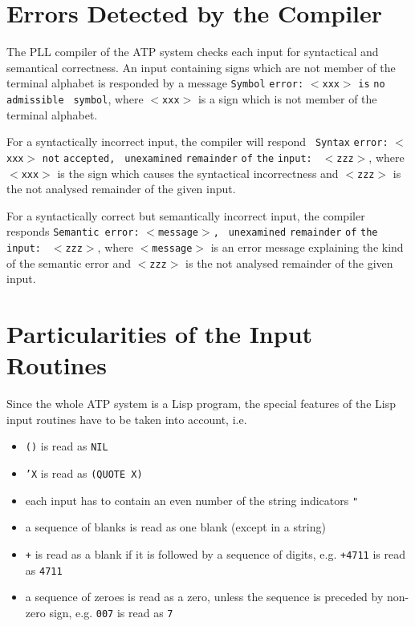 \section{Errors Detected by the Compiler}
\label{ErrorsdetectedbytheCompiler}

The PLL compiler of the ATP system checks each input for syntactical
and semantical correctness. An input containing signs which are not
member of the terminal alphabet is responded by a message {\tt Symbol}
{\tt error:} {\tt $<$xxx$>$} {\tt is} {\tt no} {\tt admissible} {\tt
symbol}, where {\tt $<$xxx$>$} is a sign which is not member of the terminal
alphabet.

For a syntactically incorrect input, the compiler will respond {\tt
Syntax} {\tt error:} {\tt $<$xxx$>$} {\tt not} {\tt accepted,} {\tt
unexamined} {\tt remainder} {\tt of} {\tt the} {\tt input:} {\tt
$<$zzz$>$}, where $<${\tt xxx}$>$ is the sign which causes the
syntactical incorrectness and {\tt $<$zzz$>$} is the not analysed
remainder of the given input.

For a syntactically correct but semantically incorrect input, the
compiler responds {\tt Semantic error:} {\tt $<$message$>$,} {\tt
unexamined} {\tt remainder} {\tt of} {\tt the} {\tt input:} {\tt
$<$zzz$>$}, where {\tt $<$message$>$} is an error message explaining
the kind of the semantic error and {\tt $<$zzz$>$} is the not analysed
remainder of the given input.


\section{Particularities of the Input Routines} 
\label{ParticularitiesoftheInputRoutines}

Since the whole ATP system is a Lisp program, the special features 
of the Lisp input routines have to be taken into account, i.e.

\begin{itemize}
\item {\tt ()} is read as {\tt NIL}
\item {\tt 'X} is read as {\tt (QUOTE X)}
\item each input has to contain an even number of the string indicators {\tt "}
\item a sequence of blanks is read as one blank (except in a string) 
\item {\tt +} is read as a blank if it is followed by a sequence of
digits, e.g. {\tt +4711} is read as {\tt 4711}
\item a sequence of zeroes is read as a zero, unless the sequence is preceded 
by non-zero sign, e.g. {\tt 007} is read as {\tt 7}
\end{itemize}


